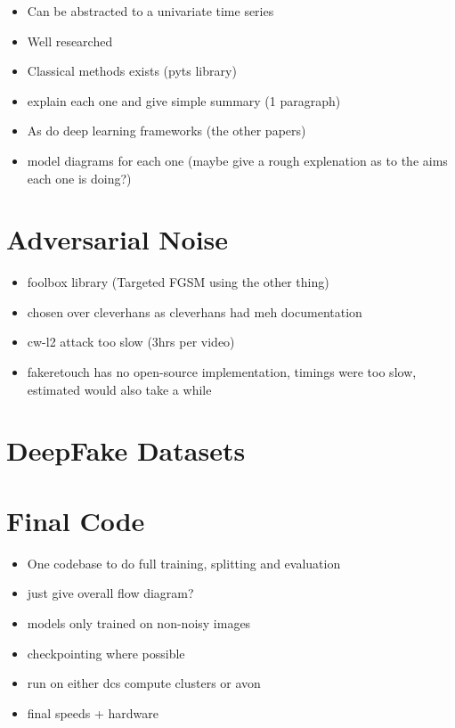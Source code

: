 \begin{itemize}
    \item Can be abstracted to a univariate time series
    \item Well researched
    \item Classical methods exists (pyts library)
    \item explain each one and give simple summary (1 paragraph)
    \item As do deep learning frameworks (the other papers)
    \item model diagrams for each one (maybe give a rough explenation as to the aims each one is doing?)
\end{itemize}

\section{Adversarial Noise}

\begin{itemize}
    \item foolbox library (Targeted FGSM using the other thing)
    \item chosen over cleverhans as cleverhans had meh documentation
    \item cw-l2 attack too slow (3hrs per video)
    \item fakeretouch has no open-source implementation, timings were too slow, estimated would also take a while
\end{itemize}

\section{DeepFake Datasets}
\label{sec:datasets}

\section{Final Code}

\begin{itemize}
    \item One codebase to do full training, splitting and evaluation
    \item just give overall flow diagram?
    \item {\huge models only trained on non-noisy images}
    \item checkpointing where possible
    \item run on either dcs compute clusters or avon
    \item final speeds + hardware
\end{itemize}